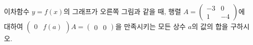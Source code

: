 \noindent\begin{minipage}[t]{0.58\linewidth}\vspace{0pt}\raggedright 이차함수 $y=f(x)$의 그래프가 오른쪽 그림과 같을 때, 행렬 $A=\begin{pmatrix} -3 & 0 \\ 1 & -4 \end{pmatrix}$에 대하여 $\begin{pmatrix} 0 & f(a) \end{pmatrix}A=\begin{pmatrix} 0 & 0 \end{pmatrix}$을 만족시키는 모든 상수 $a$의 값의 합을 구하시오.\end{minipage}\hfill\begin{minipage}[t]{0.4\linewidth}\vspace{0pt}\centering \resizebox{\ifdim\width>\linewidth\linewidth\else\width\fi}{!}{}\end{minipage}\par
